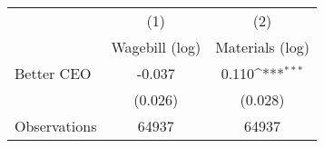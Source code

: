 {
\def\sym#1{\ifmmode^{#1}\else\(^{#1}\)\fi}
\begin{tabular}{l*{2}{c}}
\hline\hline
                    &\multicolumn{1}{c}{(1)}&\multicolumn{1}{c}{(2)}\\
                    &\multicolumn{1}{c}{Wagebill (log)}&\multicolumn{1}{c}{Materials (log)}\\
\hline
Better CEO          &      -0.037         &       0.110\sym{***}\\
                    &     (0.026)         &     (0.028)         \\
\hline
Observations        &       64937         &       64937         \\
\hline\hline
\end{tabular}
}
